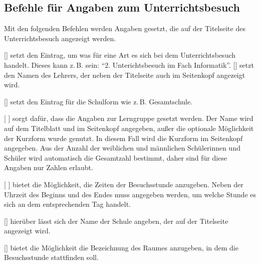 \subsection{Befehle für Angaben zum Unterrichtsbesuch}
Mit den folgenden Befehlen werden Angaben gesetzt, die auf der Titelseite des Unterrichtsbesuch angezeigt werden.
\begin{commands}
    []
        setzt den Eintrag, um was für eine Art es sich bei dem Unterrichtsbesuch handelt. Dieses kann z.\,B. sein: "`2. Unterichtsbesuch im Fach Informatik"'.
    []
        setzt den Namen des Lehrers, der neben der Titelseite auch im Seitenkopf angezeigt wird.

    []
        setzt den Eintrag für die Schulform wie z.\,B. Gesamtschule.

    [   ]
        sorgt dafür, dass die Angaben zur Lerngruppe gesetzt werden. Der Name wird auf dem Titelblatt und im Seitenkopf angegeben, außer die optionale Möglichkeit der Kurzform wurde genutzt. In diesem Fall wird die Kurzform im Seitenkopf angegeben. Aus der Anzahl der weiblichen und männlichen Schülerinnen und Schüler wird automatisch die Gesamtzahl bestimmt, daher sind für diese Angaben nur Zahlen erlaubt.

    [  ]
        bietet die Möglichkeit, die Zeiten der Besuchsstunde anzugeben. Neben der Uhrzeit des Beginns und des Endes muss angegeben werden, um welche Stunde es sich an dem entsprechenden Tag handelt.

    []
        hierüber lässt sich der Name der Schule angeben, der auf der Titelseite angezeigt wird.

    []
        bietet die Möglichkeit die Bezeichnung des Raumes anzugeben, in dem die Besuchsstunde stattfinden soll.

\end{commands}